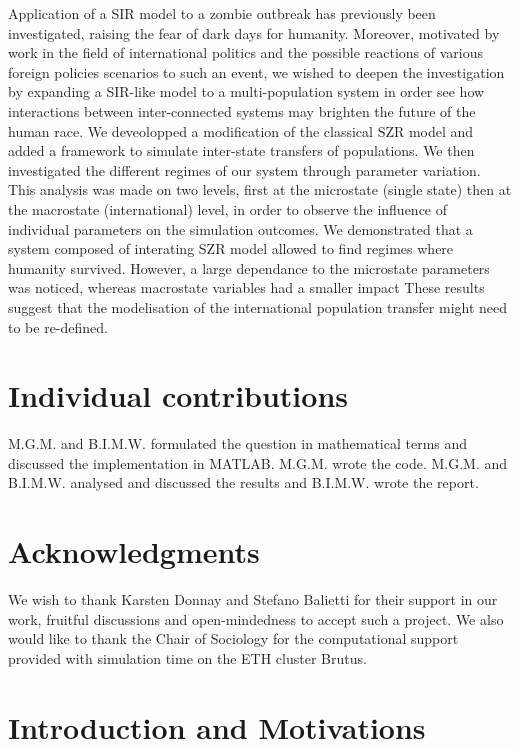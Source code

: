 \documentclass[11pt]{article} %
\begin{document}
Application of a SIR model to a zombie outbreak has previously been investigated, raising the fear of dark days for humanity. Moreover, motivated by work in the field of international politics and the possible reactions of various foreign policies scenarios to such an event, we wished to deepen the investigation by expanding a SIR-like model to a multi-population system in order see how interactions between inter-connected systems may brighten the future of the human race. We deveolopped a modification of the classical SZR model and added a framework to simulate inter-state transfers of populations. We then investigated the different regimes of our system through parameter variation. This analysis was made on two levels, first at the microstate (single state) then at the macrostate (international) level, in order to observe the influence of individual parameters on the simulation outcomes. We demonstrated that a system composed of interating SZR model allowed to find regimes where humanity survived. However, a large dependance to the microstate parameters was noticed, whereas macrostate variables had a smaller impact These results suggest that the modelisation of the international population transfer might need to be re-defined.  


\section{Individual contributions}\indent

M.G.M. and B.I.M.W. formulated the question in mathematical terms and discussed the implementation in MATLAB. M.G.M. wrote the code. M.G.M. and B.I.M.W. analysed and discussed the results and B.I.M.W. wrote the report.

\section{Acknowledgments}\indent

We wish to thank Karsten Donnay and Stefano Balietti for their support in our work, fruitful discussions and open-mindedness to accept such a project. We also would like to thank the Chair of Sociology for the computational support provided with simulation time on the ETH cluster Brutus.







\newpage
\section{Introduction and Motivations}\indent
\end{document}
